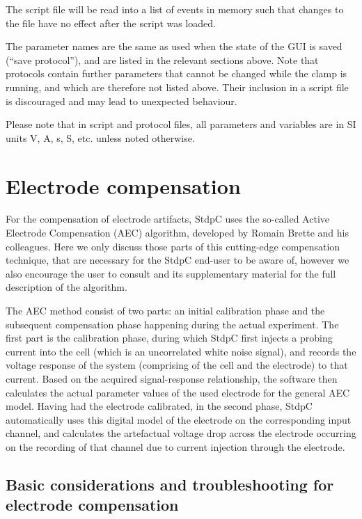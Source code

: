 \documentclass{article}
\begin{document}
The script file will be read into a list of events in memory such that
changes to the file have no effect after the script was loaded.

The parameter names are the same as used when the state of the GUI is
saved (``save protocol''), and are listed in the relevant sections above.
Note that protocols contain further parameters that cannot be changed
while the clamp is running, and which are therefore not listed above.
Their inclusion in a script file is discouraged and may lead
to unexpected behaviour.

Please note that in script and protocol files, all parameters and variables are in SI
units V, A, s, S, etc. unless noted otherwise.


\section{Electrode compensation} \label{eleccomp}

For the compensation of electrode artifacts, StdpC uses the so-called Active
Electrode Compensation (AEC) algorithm, developed by Romain Brette and his 
colleagues. Here we only discuss those parts of this cutting-edge
compensation technique, that are necessary for the StdpC end-user to be aware of,
however we also encourage the user to consult \cite{Brette2008} 
and its supplementary material for the full description of the algorithm.

The AEC method consist of two parts: an initial calibration phase and the
subsequent compensation phase happening during the actual experiment. The
first part is the calibration phase, during which StdpC first
injects a probing current into the cell (which is an uncorrelated white noise
signal), and records the voltage response of the system (comprising of
the cell and the electrode) to that current. Based on the
acquired signal-response relationship, the software then calculates the actual parameter
values of the used electrode for the general AEC model. Having had the
electrode calibrated, in the second phase, StdpC automatically uses
this digital model of the electrode on the corresponding input channel, and
calculates the artefactual voltage drop across the electrode occurring on
the recording of that channel due to current injection through the electrode.

\subsection{Basic considerations and troubleshooting for electrode compensation}
\end{document}
